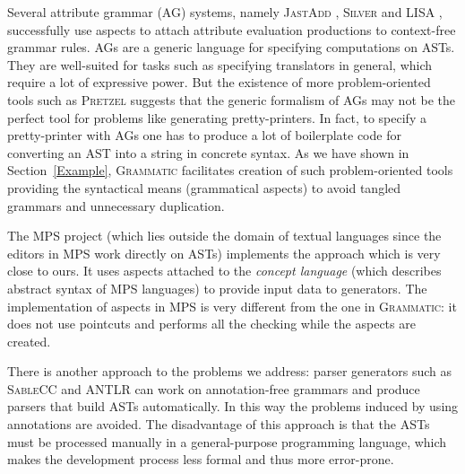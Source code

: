 \documentclass[10pt]{llncs}
\newcommand{\secref}[1]{Section~\ref{#1}}
\newcommand{\tool}[1]{\textsc{#1}}
\newcommand{\Grammatic}[0]{\tool{Grammatic}}
\begin{document}
Several attribute grammar (AG) systems, namely \tool{JastAdd} \cite{JastAdd}, \tool{Silver} \cite{Silver} and \tool{LISA} \cite{LISA}, successfully use aspects to attach attribute evaluation productions to context-free grammar rules.
AGs are a generic language for specifying computations on ASTs. They are well-suited for tasks such as specifying translators in general, which require a lot of expressive power. But the existence of more problem-oriented tools such as \tool{Pretzel} \cite{Pretzel} suggests that the generic formalism of AGs may not be the perfect tool for problems like generating pretty-printers.
In fact, to specify a pretty-printer with AGs one has to produce a lot of boilerplate code for converting an AST into a string in concrete syntax.
As we have shown in \secref{Example}, \Grammatic{} facilitates creation of such problem-oriented tools providing the syntactical means (grammatical aspects) to avoid tangled grammars and unnecessary duplication.

The \tool{MPS} \cite{MPS} project (which lies outside the domain of textual languages since the editors in \tool{MPS} work directly on ASTs) implements the approach which is very close to ours. It uses aspects attached to the \emph{concept language} (which describes abstract syntax of \tool{MPS} languages) to provide input data to generators. The implementation of aspects in \tool{MPS} is very different from the one in \Grammatic{}: it does not use pointcuts and performs all the checking while the aspects are created.

There is another approach to the problems we address: parser generators such as \tool{SableCC} \cite{SableCC} and \tool{ANTLR} \cite{ANTLR} can work on annotation-free grammars and produce parsers that build ASTs automatically. In this way the problems induced by using annotations are avoided. The disadvantage of this approach is that the ASTs must be processed manually in a general-purpose programming language, which makes the development process less formal and thus more error-prone.

%
%
%
%
\end{document}
